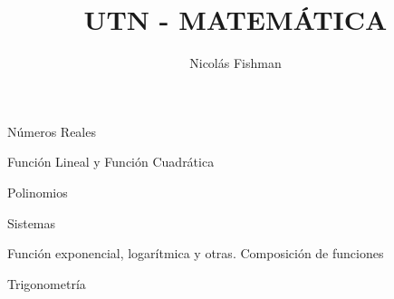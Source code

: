 \documentclass[12pt]{report}
\title{UTN - MATEMÁTICA}
\author{Nicolás Fishman}
\date{}
\begin{document}
\maketitle
\tableofcontents

\begin{itemize}
    {\item Números Reales}
     {\item Función Lineal y Función Cuadrática}
\end{itemize}





\begin{itemize}
    {\item Polinomios}
     {\item Sistemas}
\end{itemize}




\begin{itemize}
    {\item Función exponencial, logarítmica y otras. Composición de funciones}
     {\item Trigonometría}
\end{itemize}




\end{document}
